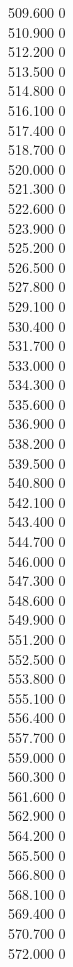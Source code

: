 { 509.600	0 \\
 510.900	0 \\
 512.200	0 \\
 513.500	0 \\
 514.800	0 \\
 516.100	0 \\
 517.400	0 \\
 518.700	0 \\
 520.000	0 \\
 521.300	0 \\
 522.600	0 \\
 523.900	0 \\
 525.200	0 \\
 526.500	0 \\
 527.800	0 \\
 529.100	0 \\
 530.400	0 \\
 531.700	0 \\
 533.000	0 \\
 534.300	0 \\
 535.600	0 \\
 536.900	0 \\
 538.200	0 \\
 539.500	0 \\
 540.800	0 \\
 542.100	0 \\
 543.400	0 \\
 544.700	0 \\
 546.000	0 \\
 547.300	0 \\
 548.600	0 \\
 549.900	0 \\
 551.200	0 \\
 552.500	0 \\
 553.800	0 \\
 555.100	0 \\
 556.400	0 \\
 557.700	0 \\
 559.000	0 \\
 560.300	0 \\
 561.600	0 \\
 562.900	0 \\
 564.200	0 \\
 565.500	0 \\
 566.800	0 \\
 568.100	0 \\
 569.400	0 \\
 570.700	0 \\
 572.000	0 \\
}
